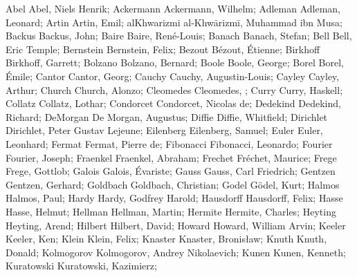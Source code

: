 \DefFriend Abel             Abel, Niels Henrik;
\DefFriend Ackermann        Ackermann, Wilhelm;
\DefFriend Adleman          Adleman, Leonard;
\DefFriend Artin            Artin, Emil;
\DefFriend alKhwarizmi      al-Khwārizmī, Muhammad ibn Musa;
\DefFriend Backus           Backus, John;
\DefFriend Baire            Baire, René-Louis;
\DefFriend Banach           Banach, Stefan;
\DefFriend Bell             Bell, Eric Temple;
\DefFriend Bernstein        Bernstein, Felix;
\DefFriend Bezout           Bézout, Étienne;
\DefFriend Birkhoff         Birkhoff, Garrett;
\DefFriend Bolzano          Bolzano, Bernard;
\DefFriend Boole            Boole, George;
\DefFriend Borel            Borel, Émile;
\DefFriend Cantor           Cantor, Georg;
\DefFriend Cauchy           Cauchy, Augustin-Louis;
\DefFriend Cayley           Cayley, Arthur;
\DefFriend Church           Church, Alonzo;
\DefFriend Cleomedes        Cleomedes, ; %
\DefFriend Curry            Curry, Haskell;
\DefFriend Collatz          Collatz, Lothar;
\DefFriend Condorcet        Condorcet, Nicolas de;
\DefFriend Dedekind         Dedekind, Richard;
\DefFriend DeMorgan         De Morgan, Augustus;
\DefFriend Diffie           Diffie, Whitfield;
\DefFriend Dirichlet        Dirichlet, Peter Gustav Lejeune;
\DefFriend Eilenberg        Eilenberg, Samuel;
\DefFriend Euler            Euler, Leonhard;
\DefFriend Fermat           Fermat, Pierre de;
\DefFriend Fibonacci        Fibonacci, Leonardo;
\DefFriend Fourier          Fourier, Joseph;
\DefFriend Fraenkel         Fraenkel, Abraham;
\DefFriend Frechet          Fréchet, Maurice;
\DefFriend Frege            Frege, Gottlob;
\DefFriend Galois           Galois, Évariste;
\DefFriend Gauss            Gauss, Carl Friedrich;
\DefFriend Gentzen          Gentzen, Gerhard;
\DefFriend Goldbach         Goldbach, Christian;
\DefFriend Godel            Gödel, Kurt;
\DefFriend Halmos           Halmos, Paul;
\DefFriend Hardy            Hardy, Godfrey Harold;
\DefFriend Hausdorff        Hausdorff, Felix;
\DefFriend Hasse            Hasse, Helmut;
\DefFriend Hellman          Hellman, Martin;
\DefFriend Hermite          Hermite, Charles;
\DefFriend Heyting          Heyting, Arend;
\DefFriend Hilbert          Hilbert, David;
\DefFriend Howard           Howard, William Arvin;
\DefFriend Keeler           Keeler, Ken;
\DefFriend Klein            Klein, Felix;
\DefFriend Knaster          Knaster, Bronisław;
\DefFriend Knuth            Knuth, Donald;
\DefFriend Kolmogorov       Kolmogorov, Andrey Nikolaevich;
\DefFriend Kunen            Kunen, Kenneth;
\DefFriend Kuratowski       Kuratowski, Kazimierz;
